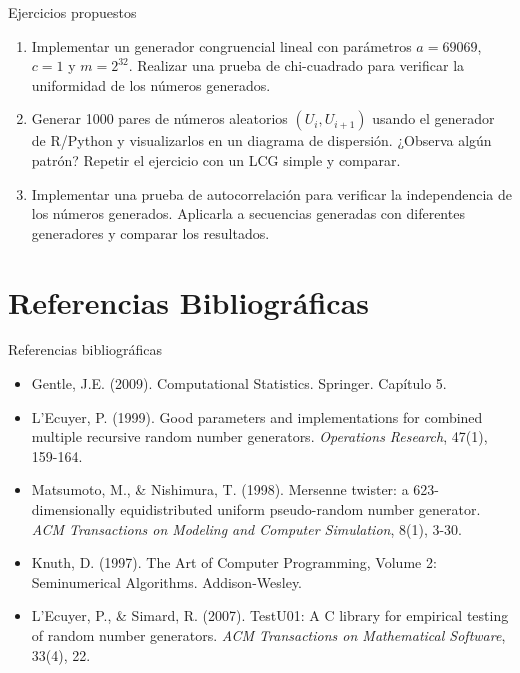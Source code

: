 \documentclass[aspectratio=169]{beamer}
\begin{document}
\begin{frame}{Ejercicios propuestos}
    \begin{enumerate}
        \item Implementar un generador congruencial lineal con parámetros $a=69069$, $c=1$ y $m=2^{32}$. Realizar una prueba de chi-cuadrado para verificar la uniformidad de los números generados.
        
        \item Generar 1000 pares de números aleatorios $(U_i, U_{i+1})$ usando el generador de R/Python y visualizarlos en un diagrama de dispersión. ¿Observa algún patrón? Repetir el ejercicio con un LCG simple y comparar.
        
        \item Implementar una prueba de autocorrelación para verificar la independencia de los números generados. Aplicarla a secuencias generadas con diferentes generadores y comparar los resultados.
    \end{enumerate}
\end{frame}

\section{Referencias Bibliográficas}

\begin{frame}{Referencias bibliográficas}
    \begin{itemize}
        \item Gentle, J.E. (2009). Computational Statistics. Springer. Capítulo 5.
        
        \item L'Ecuyer, P. (1999). Good parameters and implementations for combined multiple recursive random number generators. \textit{Operations Research}, 47(1), 159-164.
        
        \item Matsumoto, M., \& Nishimura, T. (1998). Mersenne twister: a 623-dimensionally equidistributed uniform pseudo-random number generator. \textit{ACM Transactions on Modeling and Computer Simulation}, 8(1), 3-30.
        
        \item Knuth, D. (1997). The Art of Computer Programming, Volume 2: Seminumerical Algorithms. Addison-Wesley.
        
        \item L'Ecuyer, P., \& Simard, R. (2007). TestU01: A C library for empirical testing of random number generators. \textit{ACM Transactions on Mathematical Software}, 33(4), 22.
    \end{itemize}
\end{frame}
\end{document}

